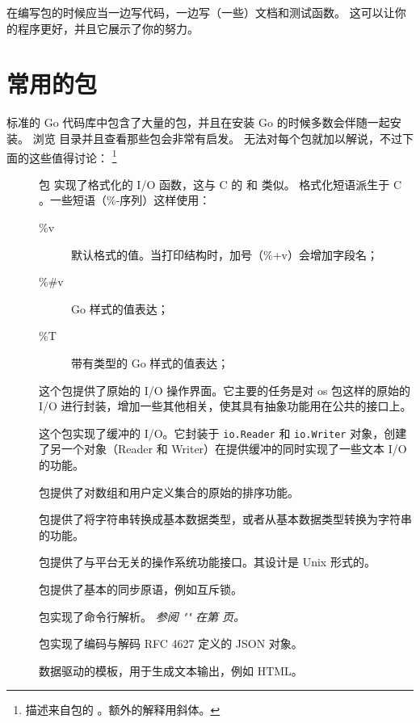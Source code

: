 \begin{lbar}
在编写包的时候应当一边写代码，一边写（一些）文档和测试函数。
这可以让你的程序更好，并且它展示了你的努力。
\end{lbar}

\section{常用的包}
标准的 Go 代码库中包含了大量的包，并且在安装 Go 的时候多数会伴随一起安装。
浏览  目录并且查看那些包会非常有启发。
无法对每个包就加以解说，不过下面的这些值得讨论：
\footnote{描述来自包的 。额外的解释用斜体。}

\begin{description}
\item[]{
包  实现了格式化的 I/O 函数，这与 C 的  和  类似。
格式化短语派生于 C 。一些短语（\%-序列）这样使用：

\begin{description}
\item[\%v]{默认格式的值。当打印结构时，加号（\%+v）会增加字段名；}
\item[\%\#v]{Go 样式的值表达；}
\item[\%T]{带有类型的 Go 样式的值表达；}
\end{description}

}

\item[]{
这个包提供了原始的 I/O 操作界面。它主要的任务是对 os 包这样的原始的 I/O 
进行封装，增加一些其他相关，使其具有抽象功能用在公共的接口上。
}
\item[]{
这个包实现了缓冲的 I/O。它封装于
\lstinline{io.Reader}
和
\lstinline{io.Writer}
对象，创建了另一个对象（Reader 和 Writer）在提供缓冲的同时实现了一些文本 I/O 的功能。
}
\item[]{
 包提供了对数组和用户定义集合的原始的排序功能。
}
\item[]{
 包提供了将字符串转换成基本数据类型，或者从基本数据类型转换为字符串的功能。
}
\item[]{
 包提供了与平台无关的操作系统功能接口。其设计是 Unix 形式的。
}
\item[]{
 包提供了基本的同步原语，例如互斥锁。
}
\item[]{
 包实现了命令行解析。
\emph{参阅 "" 在第 \pageref{sec:option parsing} 页。}
}
\item[]{
 包实现了编码与解码 RFC 4627 \cite{RFC4627} 定义的 JSON 对象。
}
\item[]{
数据驱动的模板，用于生成文本输出，例如 HTML。

}
\end{description}
